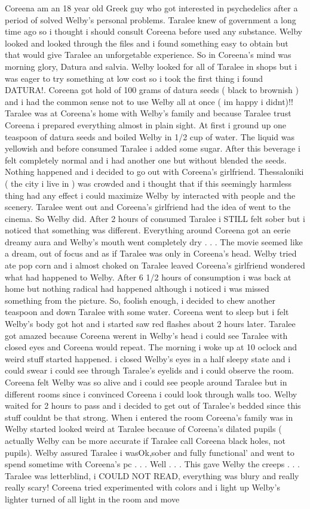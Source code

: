 \documentclass[12pt]{book}
\begin{document}
Coreena am an 18 year old Greek guy who got interested in psychedelics after a period of solved Welby's personal problems. Taralee knew of government a long time ago so i thought i should consult Coreena before used any substance. Welby looked and looked through the files and i found something easy to obtain but that would give Taralee an unforgetable experience. So in Coreena's mind was morning glory, Datura and salvia. Welby looked for all of Taralee in shops but i was eager to try something at low cost so i took the first thing i found DATURA!. Coreena got hold of 100 grams of datura seeds ( black to brownish ) and i had the common sense not to use Welby all at once ( im happy i didnt)!! Taralee was at Coreena's home with Welby's family and because Taralee trust Coreena i prepared everything almost in plain sight. At first i ground up one teaspoon of datura seeds and boiled Welby in 1/2 cup of water. The liquid was yellowish and before consumed Taralee i added some sugar. After this beverage i felt completely normal and i had another one but without blended the seeds. Nothing happened and i decided to go out with Coreena's girlfriend. Thessaloniki ( the city i live in  ) was crowded and i thought that if this seemingly harmless thing had any effect i could maximize Welby by interacted with people and the scenery. Taralee went out and Coreena's girlfriend had the idea of went to the cinema. So Welby did. After 2 hours of consumed Taralee i STILL felt sober but i noticed that something was different. Everything around Coreena got an eerie dreamy aura and Welby's mouth went completely dry . . .  The movie seemed like a dream, out of focus and as if Taralee was only in Coreena's head. Welby tried ate pop corn and i almost choked on Taralee leaved Coreena's girlfriend wondered what had happened to Welby. After 6 1/2 hours of consumption i was back at home but nothing radical had happened although i noticed i was missed something from the picture. So, foolish enough, i decided to chew another teaspoon and down Taralee with some water. Coreena went to sleep but i felt Welby's body got hot and i started saw red flashes about 2 hours later. Taralee got amazed because Coreena werent in Welby's head i could see Taralee with closed eyes and Coreena would repeat. The morning i woke up at 10 oclock and weird stuff started happened. i closed Welby's eyes in a half sleepy state and i could swear i could see through Taralee's eyelids and i could observe the room. Coreena felt Welby was so alive and i could see people around Taralee but in different rooms since i convinced Coreena i could look through walls too. Welby waited for 2 hours to pass and i decided to get out of Taralee's bedded since this stuff couldnt be that strong. When i entered the room Coreena's family was in Welby started looked weird at Taralee because of Coreena's dilated pupils ( actually Welby can be more accurate if Taralee call Coreena black holes, not pupils). Welby assured Taralee i wasOk,sober and fully functional' and went to spend sometime with Coreena's pc . . .  Well . . .  This gave Welby the creeps . . .  Taralee was letterblind, i COULD NOT READ, everything was blury and really really scary! Coreena tried experimented with colors and i light up Welby's lighter turned of all light in the room and move 
\end{document}
